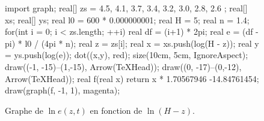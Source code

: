 \documentclass[a4paper, 11pt]{article}
\begin{document}
	\begin{figure}[H]
		\centering
		\begin{asy}
			import graph;
			real[] zs = {4.5, 4.1, 3.7, 3.4, 3.2, 3.0, 2.8, 2.6 };
			real[] xs;
			real[] ys;
			real l0 = 600 * 0.000000001;
			real H = 5;
			real n = 1.4;
			for(int i = 0; i < zs.length; ++i) {
				real df = (i+1) * 2pi;
				real e = (df - pi) * l0 / (4pi * n);
				real z = zs[i];
				real x = xs.push(log(H - z));
				real y = ys.push(log(e));
				dot((x,y), red);
			}
			size(10cm, 5cm, IgnoreAspect);
			draw((-1, -15)--(1,-15), Arrow(TeXHead));
			draw((0, -17)--(0,-12), Arrow(TeXHead));
			real f(real x) {return x * 1.70567946 -14.84761454; }
			draw(graph(f, -1, 1), magenta);
		\end{asy}
		\caption{Graphe de $\ln e(z,t)$\/ en fonction de $\ln(H-z)$.}
	\end{figure}

	\sign
\end{document}
